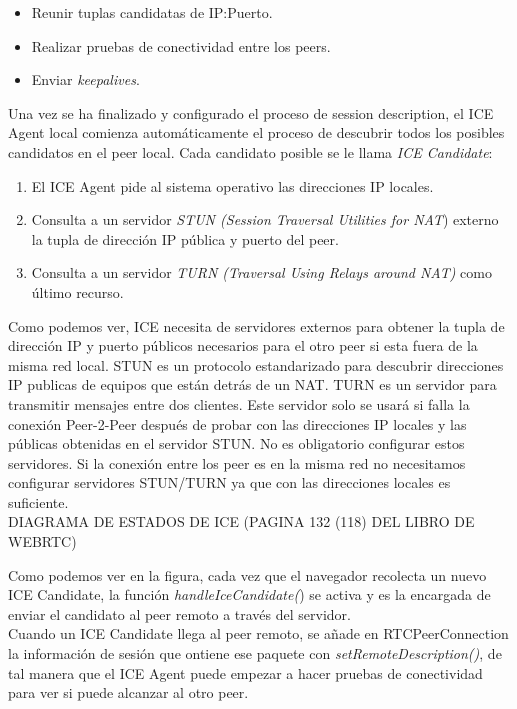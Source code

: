 \begin{itemize}
\item Reunir tuplas candidatas de IP:Puerto.
\item Realizar pruebas de conectividad entre los peers.
\item Enviar \textit{keepalives}.
\end{itemize}

Una vez se ha finalizado y configurado el proceso de session description, el ICE Agent local comienza automáticamente el proceso de descubrir todos los posibles candidatos en el peer local. Cada candidato posible se le llama \textit{ICE Candidate}:

\begin{enumerate}
\item El ICE Agent pide al sistema operativo las direcciones IP locales.
\item Consulta a un servidor \emph{STUN (Session Traversal Utilities for NAT}) externo la tupla de dirección IP pública y puerto del peer.
\item Consulta a un servidor \emph{TURN (Traversal Using Relays around NAT)} como último recurso. 
\end{enumerate}

Como podemos ver, ICE necesita de servidores externos para obtener la tupla de dirección IP y puerto públicos necesarios para el otro peer si esta fuera de la misma red local. STUN  es un protocolo estandarizado para descubrir direcciones IP publicas de equipos que están detrás de un NAT. TURN es un servidor para transmitir mensajes entre dos clientes. Este servidor solo se usará si falla la conexión Peer-2-Peer después de probar con las direcciones IP locales y las públicas obtenidas en el servidor STUN. No es obligatorio configurar estos servidores. Si la conexión entre los peer es en la misma red no necesitamos configurar servidores STUN/TURN ya que con las direcciones locales es suficiente.\\

DIAGRAMA DE ESTADOS DE ICE (PAGINA 132 (118) DEL LIBRO DE WEBRTC)

Como podemos ver en la figura, cada vez que el navegador recolecta un nuevo ICE Candidate, la función \textit{handleIceCandidate(}) se activa y es la encargada de enviar el candidato al peer remoto a través del servidor.\\
 
Cuando un ICE Candidate llega al peer remoto, se añade en RTCPeerConnection la información de sesión que ontiene ese paquete con \textit{setRemoteDescription()}, de tal manera que el ICE Agent puede empezar a hacer pruebas de conectividad para ver si puede alcanzar al otro peer.\\

